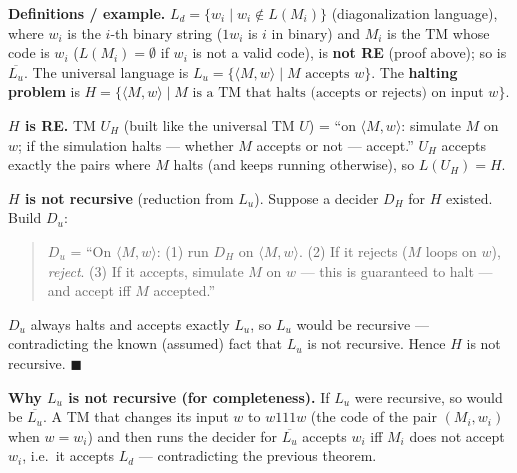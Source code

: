\documentclass[11pt,a4paper]{article}
\begin{document}
\begin{solution}
\textbf{Definitions / example.} $L_d=\{w_i\mid w_i\notin L(M_i)\}$ (diagonalization language), where $w_i$ is the $i$-th binary string ($1w_i$ is $i$ in binary) and $M_i$ is the TM whose code is $w_i$ ($L(M_i)=\emptyset$ if $w_i$ is not a valid code), is \textbf{not RE} (proof above); so is $\overline{L_u}$. The universal language is $L_u=\{\langle M,w\rangle\mid M\text{ accepts }w\}$. The \textbf{halting problem} is $H=\{\langle M,w\rangle\mid M\text{ is a TM that halts (accepts or rejects) on input }w\}$.

\textbf{$H$ is RE.} TM $U_H$ (built like the universal TM $U$) = ``on $\langle M,w\rangle$: simulate $M$ on $w$; if the simulation halts --- whether $M$ accepts or not --- accept.'' $U_H$ accepts exactly the pairs where $M$ halts (and keeps running otherwise), so $L(U_H)=H$.

\textbf{$H$ is not recursive} (reduction from $L_u$). Suppose a decider $D_H$ for $H$ existed. Build $D_u$:
\begin{quote}
$D_u$ = ``On $\langle M,w\rangle$: (1) run $D_H$ on $\langle M,w\rangle$. (2) If it rejects ($M$ loops on $w$), \emph{reject}. (3) If it accepts, simulate $M$ on $w$ --- this is guaranteed to halt --- and accept iff $M$ accepted.''
\end{quote}
$D_u$ always halts and accepts exactly $L_u$, so $L_u$ would be recursive --- contradicting the known (assumed) fact that $L_u$ is not recursive. Hence $H$ is not recursive. \hfill$\blacksquare$

\textbf{Why $L_u$ is not recursive (for completeness).} If $L_u$ were recursive, so would be $\overline{L_u}$. A TM that changes its input $w$ to $w111w$ (the code of the pair $(M_i,w_i)$ when $w=w_i$) and then runs the decider for $\overline{L_u}$ accepts $w_i$ iff $M_i$ does not accept $w_i$, i.e.\ it accepts $L_d$ --- contradicting the previous theorem.
\end{solution}
\end{document}
